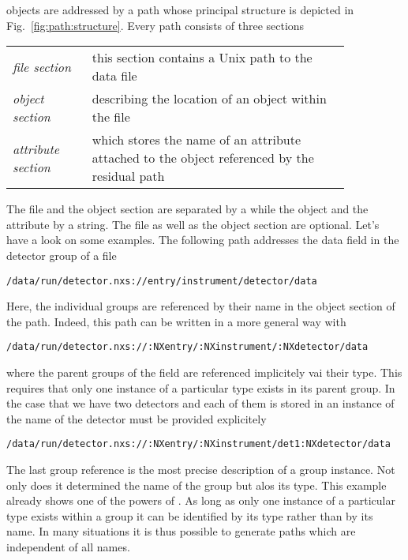 \nexus objects are addressed by a path whose principal structure is depicted in
Fig.~\ref{fig:path:structure}. Every path consists of three sections
\begin{center}
\renewcommand{\arraystretch}{1.5}
\begin{tabular}{m{0.2\linewidth}m{0.65\linewidth}}
 \emph{file section}     & this section contains a Unix path to the data file  \\
 \emph{object section}    & describing the location of an object within the file \\
 \emph{attribute section} & which stores the name of an attribute attached to the 
                     object referenced by the residual path
\end{tabular}
\end{center}
The file and the object section are separated by a \cpp{://} while the object 
and the attribute by a  string. The file as well as the object section
are optional. 
Let's have a look on some examples. The following path addresses the data field 
in the detector group of a file
\begin{verbatim}
/data/run/detector.nxs://entry/instrument/detector/data
\end{verbatim}
Here, the individual groups are referenced by their name in the object section 
of the path. Indeed, this path can be written in a more general way with 
\begin{verbatim}
/data/run/detector.nxs://:NXentry/:NXinstrument/:NXdetector/data
\end{verbatim}
where the parent groups of the  field are referenced implicitely vai
their type.  This requires that only one instance of a particular type exists in
its parent group. In the case that we have two detectors and each of them is
stored in an instance of  the name of the detector must be
provided explicitely 
\begin{verbatim}
/data/run/detector.nxs://:NXentry/:NXinstrument/det1:NXdetector/data
\end{verbatim}
The last group reference  is the most precise 
description of a group instance. Not only does it determined the name 
of the group but alos its type.  This example already shows one of the 
powers of \nexus. As long as only one instance of a particular type exists
within a group it can be identified by its type rather than by its name. 
In many situations it is thus possible to generate paths which are independent
of all names.

